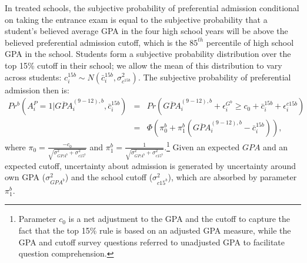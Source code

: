 In treated schools, the subjective probability of preferential admission conditional on taking the entrance exam is equal to the subjective probability that a student's believed average GPA in the four high school years will be above the believed preferential admission cutoff, which is the $85^{th}$ percentile of high school GPA in the school. Students form a subjective probability distribution over the top 15\% cutoff in their school; we allow the mean of this distribution to vary across students: $c_i^{15b}\sim N(\bar{c}_i^{15b},\sigma^2_{c^{15b}})$. The subjective probability of preferential admission then is:
\begin{eqnarray}
	Pr^b(A^P_i=1|\overline{GPA}^{(9-12),b}_{i},\bar{c}_i^{15b})&=&Pr\left( \overline{GPA}^{(9-12),b}_{i}+\epsilon_i^{G^b}\geq c_0+\bar{c}_i^{15b}+\epsilon_i^{c15b} \right)\\ \nonumber
	&=&\Phi\left(\pi_0^b+\pi_1^b (\overline{GPA}^{(9-12),b}_{i}-\bar{c}_i^{15b})\right),
\end{eqnarray}
\noindent  where $\pi_0=\frac{-c_0}{\sqrt{\sigma^2_{GPA^b}+\sigma^2_{c15^{b}}}}$ and $\pi_1^b=\frac{1}{\sqrt{\sigma^2_{GPA^b}+\sigma^2_{c15^{b}}}}$.\footnote{Parameter $c_0$ is a net adjustment to the GPA and the cutoff to capture the fact that the top 15\% rule is based on an adjusted GPA measure, while the GPA and cutoff survey questions referred to unadjusted GPA to facilitate question comprehension.} Given an expected $GPA$ and an expected cutoff, uncertainty about admission is generated by uncertainty around own GPA ($\sigma^2_{GPA^b}$) and the school cutoff ($\sigma^2_{c15^{b}}$), which are absorbed by parameter $\pi_1^b$.



